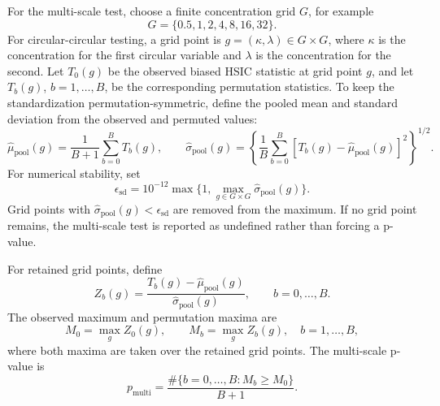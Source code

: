 \documentclass[11pt]{article}
\begin{document}
For the multi-scale test, choose a finite concentration grid \(G\), for example
\[
  G=\{0.5,1,2,4,8,16,32\}.
\]
For circular-circular testing, a grid point is \(g=(\kappa,\lambda)\in G\times G\), where \(\kappa\) is the concentration for the first circular variable and \(\lambda\) is the concentration for the second.  Let \(T_0(g)\) be the observed biased HSIC statistic at grid point \(g\), and let \(T_b(g)\), \(b=1,\ldots,B\), be the corresponding permutation statistics.  To keep the standardization permutation-symmetric, define the pooled mean and standard deviation from the observed and permuted values:
\[
  \widehat\mu_{\mathrm{pool}}(g)=\frac{1}{B+1}\sum_{b=0}^B T_b(g),
  \qquad
  \widehat\sigma_{\mathrm{pool}}(g)=
  \left\{\frac{1}{B}\sum_{b=0}^B[T_b(g)-\widehat\mu_{\mathrm{pool}}(g)]^2\right\}^{1/2}.
\]
For numerical stability, set
\[
  \epsilon_{\mathrm{sd}}=10^{-12}\max\{1,\max_{g\in G\times G}\widehat\sigma_{\mathrm{pool}}(g)\}.
\]
Grid points with \(\widehat\sigma_{\mathrm{pool}}(g)<\epsilon_{\mathrm{sd}}\) are removed from the maximum.  If no grid point remains, the multi-scale test is reported as undefined rather than forcing a p-value.

For retained grid points, define
\[
  Z_b(g)=
  \frac{T_b(g)-\widehat\mu_{\mathrm{pool}}(g)}
       {\widehat\sigma_{\mathrm{pool}}(g)},
  \qquad b=0,\ldots,B.
\]
The observed maximum and permutation maxima are
\[
  M_0=\max_{g}Z_0(g),
  \qquad
  M_b=\max_{g}Z_b(g),\quad b=1,\ldots,B,
\]
where both maxima are taken over the retained grid points.  The multi-scale p-value is
\[
  p_{\mathrm{multi}}=
  \frac{\#\{b=0,\ldots,B:M_b\ge M_0\}}{B+1}.
\]

\begin{center}
\end{center}
\end{document}
